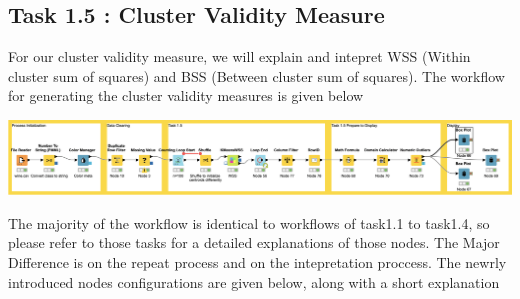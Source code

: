 \documentclass[11pt]{article}
\begin{document}
		\subsection*{Task 1.5 : Cluster Validity Measure}
			For our cluster validity measure, we will explain and intepret WSS (Within cluster sum of squares) and BSS (Between cluster sum of squares). The workflow for generating the cluster validity measures is given below
			\iftrue
			\begin{center}
				\includegraphics[scale=0.25]{res/t1/t15/t15-workflow}
			\end{center}
			\fi
			The majority of the workflow is identical to workflows of task1.1 to task1.4, so please refer to those tasks for a detailed explanations of those nodes. The Major Difference is on the repeat process and on the intepretation proccess. The newrly introduced nodes configurations are given below, along with a short explanation
			\iftrue
\end{document}
